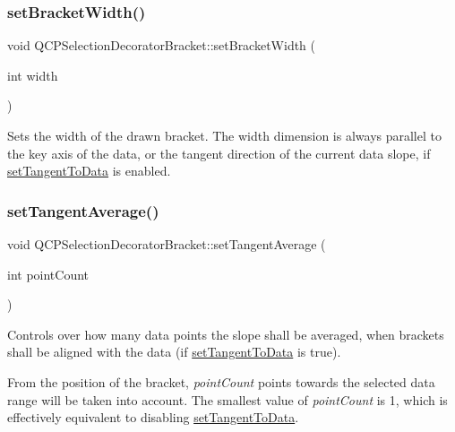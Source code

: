 \subsubsection{\texorpdfstring{set\+Bracket\+Width()}{setBracketWidth()}}
{\footnotesize\ttfamily void Q\+C\+P\+Selection\+Decorator\+Bracket\+::set\+Bracket\+Width (\begin{DoxyParamCaption}\item[{int}]{width }\end{DoxyParamCaption})}

Sets the width of the drawn bracket. The width dimension is always parallel to the key axis of the data, or the tangent direction of the current data slope, if \hyperlink{class_q_c_p_selection_decorator_bracket_a93bc6086e53a5e40a08641a7b2e2cdd5}{set\+Tangent\+To\+Data} is enabled. \mbox{\label{class_q_c_p_selection_decorator_bracket_adb2d0876f25a77c88042b70818f1d6e4}} 
\subsubsection{\texorpdfstring{set\+Tangent\+Average()}{setTangentAverage()}}
{\footnotesize\ttfamily void Q\+C\+P\+Selection\+Decorator\+Bracket\+::set\+Tangent\+Average (\begin{DoxyParamCaption}\item[{int}]{point\+Count }\end{DoxyParamCaption})}

Controls over how many data points the slope shall be averaged, when brackets shall be aligned with the data (if \hyperlink{class_q_c_p_selection_decorator_bracket_a93bc6086e53a5e40a08641a7b2e2cdd5}{set\+Tangent\+To\+Data} is true).

From the position of the bracket, {\itshape point\+Count} points towards the selected data range will be taken into account. The smallest value of {\itshape point\+Count} is 1, which is effectively equivalent to disabling \hyperlink{class_q_c_p_selection_decorator_bracket_a93bc6086e53a5e40a08641a7b2e2cdd5}{set\+Tangent\+To\+Data}. \mbox{\label{class_q_c_p_selection_decorator_bracket_a93bc6086e53a5e40a08641a7b2e2cdd5}} 
